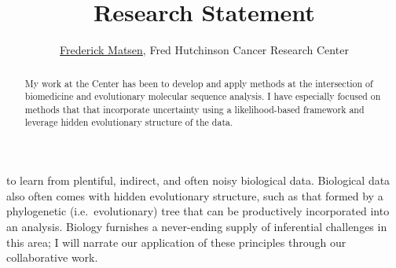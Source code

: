 \documentclass[hyper]{tufte-handout}
\title{Research Statement}
\author{\href{http://matsen.fhcrc.org/}{Frederick Matsen}, Fred Hutchinson Cancer Research Center}
\begin{document}
\maketitle

\begin{abstract}
\noindent
My work at the Center has been to develop and apply methods at the intersection of biomedicine and evolutionary molecular sequence analysis.
I have especially focused on methods that that incorporate uncertainty using a likelihood-based framework and leverage hidden evolutionary structure of the data.
\end{abstract}


 to learn from plentiful, indirect, and often noisy biological data.
Biological data also often comes with hidden evolutionary structure, such as that formed by a phylogenetic (i.e.\ evolutionary) tree that can be productively incorporated into an analysis.
Biology furnishes a never-ending supply of inferential challenges in this area; I will narrate our application of these principles through our collaborative work.
\end{document}
